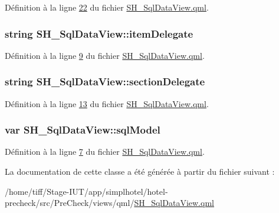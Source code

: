 Définition à la ligne \hyperlink{SH__SqlDataView_8qml_source_l00022}{22} du fichier \hyperlink{SH__SqlDataView_8qml_source}{S\-H\-\_\-\-Sql\-Data\-View.\-qml}.

\hypertarget{classSH__SqlDataView_a7ae6767ae8a82bd33b942c774c534a33}{
\subsubsection[{item\-Delegate}]{\setlength{\rightskip}{0pt plus 5cm}string S\-H\-\_\-\-Sql\-Data\-View\-::item\-Delegate}}\label{classSH__SqlDataView_a7ae6767ae8a82bd33b942c774c534a33}


Définition à la ligne \hyperlink{SH__SqlDataView_8qml_source_l00009}{9} du fichier \hyperlink{SH__SqlDataView_8qml_source}{S\-H\-\_\-\-Sql\-Data\-View.\-qml}.

\hypertarget{classSH__SqlDataView_a60486947b034f5fca72a2d5775ad1767}{
\subsubsection[{section\-Delegate}]{\setlength{\rightskip}{0pt plus 5cm}string S\-H\-\_\-\-Sql\-Data\-View\-::section\-Delegate}}\label{classSH__SqlDataView_a60486947b034f5fca72a2d5775ad1767}


Définition à la ligne \hyperlink{SH__SqlDataView_8qml_source_l00013}{13} du fichier \hyperlink{SH__SqlDataView_8qml_source}{S\-H\-\_\-\-Sql\-Data\-View.\-qml}.

\hypertarget{classSH__SqlDataView_ad538d6f1dd43a7d01c7960a74ca131dc}{
\subsubsection[{sql\-Model}]{\setlength{\rightskip}{0pt plus 5cm}var S\-H\-\_\-\-Sql\-Data\-View\-::sql\-Model}}\label{classSH__SqlDataView_ad538d6f1dd43a7d01c7960a74ca131dc}


Définition à la ligne \hyperlink{SH__SqlDataView_8qml_source_l00007}{7} du fichier \hyperlink{SH__SqlDataView_8qml_source}{S\-H\-\_\-\-Sql\-Data\-View.\-qml}.



La documentation de cette classe a été générée à partir du fichier suivant \-:\begin{DoxyCompactItemize}
\item 
/home/tiff/\-Stage-\/\-I\-U\-T/app/simplhotel/hotel-\/precheck/src/\-Pre\-Check/views/qml/\hyperlink{SH__SqlDataView_8qml}{S\-H\-\_\-\-Sql\-Data\-View.\-qml}\end{DoxyCompactItemize}
